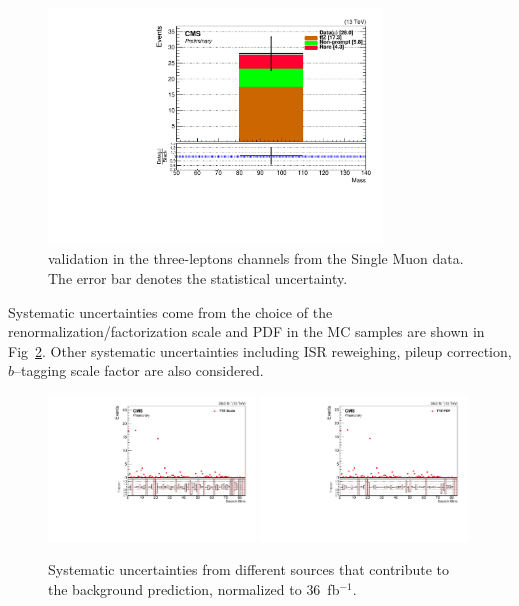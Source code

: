 \begin{figure}[htbp]
  \begin{center}
    \includegraphics[width=0.79\textwidth]{sections/mc4/Backgrounds/TTZRare/figures/RecoZMass_7.pdf}
  \end{center}
  \caption{\ttbarZ validation in the three-leptons channels from the
  Single Muon data. The error bar denotes the statistical uncertainty.}
  \label{fig:ttZSUSY}
\end{figure}


Systematic uncertainties come from the choice of the renormalization/factorization
scale and PDF in the \ttbarZ MC samples are shown in
Fig~\ref{fig:ttZSysUncern}.  Other systematic uncertainties including ISR
reweighing, pileup correction, $b$--tagging scale factor are also considered.


\begin{figure}[htbp]
  \begin{center}
    \includegraphics[width=0.49\textwidth]{sections/mc4/Backgrounds/TTZRare/figures/TTZ_Scale.pdf}
    \includegraphics[width=0.49\textwidth]{sections/mc4/Backgrounds/TTZRare/figures/TTZ_PDF.pdf}
  \end{center}
  \caption{Systematic uncertainties from different sources that contribute to 
  the \ttbarZ background prediction, normalized to $36$~fb$^{-1}$.}
  \label{fig:ttZSysUncern}
\end{figure}

